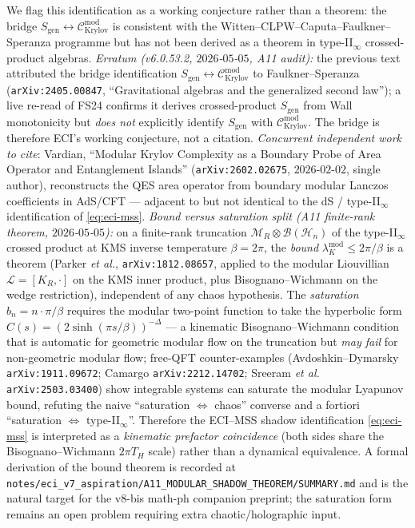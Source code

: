 \documentclass[reprint,amsmath,amssymb,aps,prd,superscriptaddress]{revtex4-2}
\providecommand{\1}{\mathbf{1}}
\begin{document}
We flag this identification as a working conjecture rather than a theorem: the bridge
$S_\mathrm{gen} \leftrightarrow \mathcal{C}_\mathrm{Krylov}^\mathrm{mod}$ is consistent
with the Witten--CLPW--Caputa--Faulkner--Speranza programme but has not been derived as
a theorem in type-II$_\infty$ crossed-product algebras. \emph{Erratum (v6.0.53.2,
$2026$-$05$-$05$, A11 audit):} the previous text attributed the bridge identification
$S_\mathrm{gen} \leftrightarrow \mathcal{C}_\mathrm{Krylov}^\mathrm{mod}$ to
Faulkner--Speranza (\texttt{arXiv:2405.00847}, ``Gravitational algebras and the
generalized second law''); a live re-read of FS24 confirms it derives crossed-product
$S_\mathrm{gen}$ from Wall monotonicity but \emph{does not} explicitly identify
$S_\mathrm{gen}$ with $\mathcal{C}_\mathrm{Krylov}^\mathrm{mod}$. The bridge is therefore
ECI's working conjecture, not a citation. \emph{Concurrent independent work to cite}:
Vardian, ``Modular Krylov Complexity as a Boundary Probe of Area Operator and
Entanglement Islands'' (\texttt{arXiv:2602.02675}, $2026$-$02$-$02$, single author),
reconstructs the QES area operator from boundary modular Lanczos coefficients in
AdS/CFT --- adjacent to but not identical to the dS / type-II$_\infty$ identification
of \eqref{eq:eci-mss}.
\emph{Bound versus saturation split (A11 finite-rank theorem, $2026$-$05$-$05$):}
on a finite-rank truncation $\mathcal{M}_R \otimes \mathcal{B}(\mathcal{H}_n)$ of
the type-II$_\infty$ crossed product at KMS inverse temperature $\beta = 2\pi$, the
\emph{bound} $\lambda_K^\mathrm{mod} \le 2\pi/\beta$ is a theorem (Parker
\emph{et al.}, \texttt{arXiv:1812.08657}, applied to the modular Liouvillian
$\mathcal{L} = [K_R, \cdot]$ on the KMS inner product, plus Bisognano--Wichmann
on the wedge restriction), independent of any chaos hypothesis. The \emph{saturation}
$b_n = n \cdot \pi/\beta$ requires the modular two-point function to take the
hyperbolic form $C(s) = (2 \sinh(\pi s/\beta))^{-\Delta}$ --- a kinematic
Bisognano--Wichmann condition that is automatic for geometric modular flow on
the truncation but \emph{may fail} for non-geometric modular flow; free-QFT
counter-examples (Avdoshkin--Dymarsky \texttt{arXiv:1911.09672}; Camargo
\texttt{arXiv:2212.14702}; Sreeram \emph{et al.} \texttt{arXiv:2503.03400})
show integrable systems can saturate the modular Lyapunov bound, refuting the
naive ``saturation $\Leftrightarrow$ chaos'' converse and a fortiori
``saturation $\Leftrightarrow$ type-II$_\infty$''. Therefore the
ECI--MSS shadow identification \eqref{eq:eci-mss} is interpreted as a
\emph{kinematic prefactor coincidence} (both sides share the
Bisognano--Wichmann $2\pi T_H$ scale) rather than a dynamical equivalence.
A formal derivation of the bound theorem is recorded at
\texttt{notes/eci\_v7\_aspiration/A11\_MODULAR\_SHADOW\_THEOREM/SUMMARY.md}
and is the natural target for the v8-bis math-ph companion preprint; the saturation
form remains an open problem requiring extra chaotic/holographic input.
\end{document}
